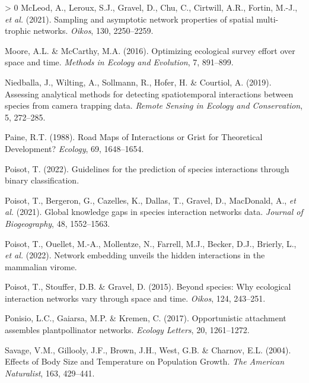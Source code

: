 \documentclass[11pt]{article}
\newlength{\cslhangindent}
\newenvironment{CSLReferences}[3] %
 {%
  \setlength{\parindent}{0pt}
  \ifodd #1 \everypar{\setlength{\hangindent}{\cslhangindent}}\ignorespaces\fi
  \ifnum #2 > 0
  \setlength{\parskip}{#2\baselineskip}
  \fi
 }%
 {}
\begin{document}
\begin{CSLReferences}{1}{0}
\leavevmode\hypertarget{ref-McLeod2021SamAsy}{}%
McLeod, A., Leroux, S.J., Gravel, D., Chu, C., Cirtwill, A.R., Fortin,
M.-J., \emph{et al.} (2021). Sampling and asymptotic network properties
of spatial multi-trophic networks. \emph{Oikos}, 130, 2250--2259.

\leavevmode\hypertarget{ref-Moore2016OptEco}{}%
Moore, A.L. \& McCarthy, M.A. (2016). Optimizing ecological survey
effort over space and time. \emph{Methods in Ecology and Evolution}, 7,
891--899.

\leavevmode\hypertarget{ref-Niedballa2019AssAna}{}%
Niedballa, J., Wilting, A., Sollmann, R., Hofer, H. \& Courtiol, A.
(2019). Assessing analytical methods for detecting spatiotemporal
interactions between species from camera trapping data. \emph{Remote
Sensing in Ecology and Conservation}, 5, 272--285.

\leavevmode\hypertarget{ref-Paine1988RoaMap}{}%
Paine, R.T. (1988). Road Maps of Interactions or Grist for Theoretical
Development? \emph{Ecology}, 69, 1648--1654.

\leavevmode\hypertarget{ref-Poisot2022GuiPre}{}%
Poisot, T. (2022). Guidelines for the prediction of species interactions
through binary classification.

\leavevmode\hypertarget{ref-Poisot2021GloKno}{}%
Poisot, T., Bergeron, G., Cazelles, K., Dallas, T., Gravel, D.,
MacDonald, A., \emph{et al.} (2021). Global knowledge gaps in species
interaction networks data. \emph{Journal of Biogeography}, 48,
1552--1563.

\leavevmode\hypertarget{ref-Poisot2022NetEmb}{}%
Poisot, T., Ouellet, M.-A., Mollentze, N., Farrell, M.J., Becker, D.J.,
Brierly, L., \emph{et al.} (2022). Network embedding unveils the hidden
interactions in the mammalian virome.

\leavevmode\hypertarget{ref-Poisot2015SpeWhy}{}%
Poisot, T., Stouffer, D.B. \& Gravel, D. (2015). Beyond species: Why
ecological interaction networks vary through space and time.
\emph{Oikos}, 124, 243--251.

\leavevmode\hypertarget{ref-Ponisio2017OppAtt}{}%
Ponisio, L.C., Gaiarsa, M.P. \& Kremen, C. (2017). Opportunistic
attachment assembles plantpollinator networks. \emph{Ecology Letters},
20, 1261--1272.

\leavevmode\hypertarget{ref-Savage2004EffBod}{}%
Savage, V.M., Gillooly, J.F., Brown, J.H., West, G.B. \& Charnov, E.L.
(2004). Effects of Body Size and Temperature on Population Growth.
\emph{The American Naturalist}, 163, 429--441.


\end{CSLReferences}
\end{document}
